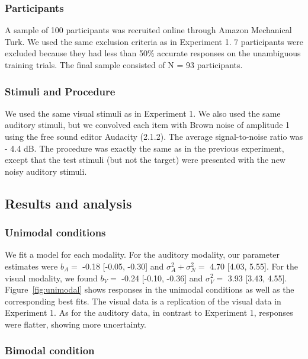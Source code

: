\documentclass[english,,man,floatsintext]{apa6}
\theoremstyle{definition}
\theoremstyle{definition}
\theoremstyle{definition}
\theoremstyle{remark}
\begin{document}
\subsubsection{Participants}\label{participants-2}

A sample of 100 participants was recruited online through Amazon
Mechanical Turk. We used the same exclusion criteria as in Experiment 1.
7 participants were excluded because they had less than 50\% accurate
responses on the unambiguous training trials. The final sample consisted
of N = 93 participants.

\subsubsection{Stimuli and Procedure}\label{stimuli-and-procedure}

We used the same visual stimuli as in Experiment 1. We also used the
same auditory stimuli, but we convolved each item with Brown noise of
amplitude 1 using the free sound editor Audacity (2.1.2). The average
signal-to-noise ratio was - 4.4 dB. The procedure was exactly the same
as in the previous experiment, except that the test stimuli (but not the
target) were presented with the new noisy auditory stimuli.

\subsection{Results and analysis}\label{results-and-analysis-2}

\subsubsection{Unimodal conditions}\label{unimodal-conditions-3}

We fit a model for each modality. For the auditory modality, our
parameter estimates were \(b_A=\) -0.18 {[}-0.05, -0.30{]} and
\(\sigma^2_A+\sigma^2_N=\) 4.70 {[}4.03, 5.55{]}. For the visual
modality, we found \(b_V=\) -0.24 {[}-0.10, -0.36{]} and \(\sigma^2_V=\)
3.93 {[}3.43, 4.55{]}. Figure~\ref{fig:unimodal} shows responses in the
unimodal conditions as well as the corresponding best fits. The visual
data is a replication of the visual data in Experiment 1. As for the
auditory data, in contrast to Experiment 1, responses were flatter,
showing more uncertainty.

\subsubsection{Bimodal condition}\label{bimodal-condition-2}
\end{document}
